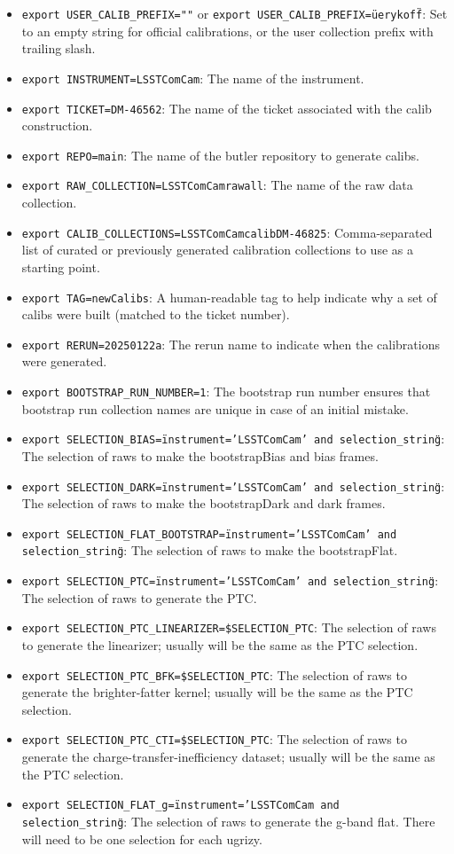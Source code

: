 \documentclass[DM,authoryear,toc]{lsstdoc}
\begin{document}
\begin{itemize}
\item{\texttt{export USER\_CALIB\_PREFIX=""} or \texttt{export USER\_CALIB\_PREFIX=\"u\/erykoff\"}: Set to an empty string for official calibrations, or the user collection prefix with trailing slash.}
\item{\texttt{export INSTRUMENT=LSSTComCam}: The name of the instrument.}
\item{\texttt{export TICKET=DM-46562}: The name of the ticket associated with the calib construction.}
\item{\texttt{export REPO=main}: The name of the butler repository to generate calibs.}
\item{\texttt{export RAW\_COLLECTION=LSSTComCam\/raw\/all}: The name of the raw data collection.}
\item{\texttt{export CALIB\_COLLECTIONS=LSSTComCam\/calib\/DM-46825}: Comma-separated list of curated or previously generated calibration collections to use as a starting point.}
\item{\texttt{export TAG=newCalibs}: A human-readable tag to help indicate why a set of calibs were built (matched to the ticket number).}
\item{\texttt{export RERUN=20250122a}: The rerun name to indicate when the calibrations were generated.}
\item{\texttt{export BOOTSTRAP\_RUN\_NUMBER=1}: The bootstrap run number ensures that bootstrap run collection names are unique in case of an initial mistake.}
\item{\texttt{export SELECTION\_BIAS=\"instrument='LSSTComCam' and selection\_string\"}: The selection of raws to make the bootstrapBias and bias frames.}
\item{\texttt{export SELECTION\_DARK=\"instrument='LSSTComCam' and selection\_string\"}: The selection of raws to make the bootstrapDark and dark frames.}
\item{\texttt{export SELECTION\_FLAT\_BOOTSTRAP=\"instrument='LSSTComCam' and selection\_string\"}: The selection of raws to make the bootstrapFlat.}
\item{\texttt{export SELECTION\_PTC=\"instrument='LSSTComCam' and selection\_string\"}: The selection of raws to generate the PTC.}
\item{\texttt{export SELECTION\_PTC\_LINEARIZER=\$SELECTION\_PTC}: The selection of raws to generate the linearizer; usually will be the same as the PTC selection.}
\item{\texttt{export SELECTION\_PTC\_BFK=\$SELECTION\_PTC}: The selection of raws to generate the brighter-fatter kernel; usually will be the same as the PTC selection.}
\item{\texttt{export SELECTION\_PTC\_CTI=\$SELECTION\_PTC}: The selection of raws to generate the charge-transfer-inefficiency dataset; usually will be the same as the PTC selection.}
\item{\texttt{export SELECTION\_FLAT\_g=\"instrument='LSSTComCam and selection\_string\"}: The selection of raws to generate the g-band flat. There will need to be one selection for each ugrizy.}
\end{itemize}
\end{document}
